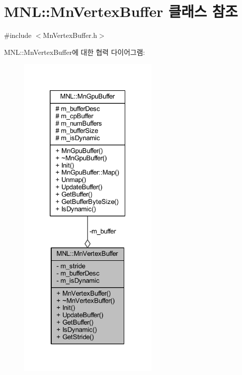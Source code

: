 \hypertarget{class_m_n_l_1_1_mn_vertex_buffer}{}\section{M\+NL\+:\+:Mn\+Vertex\+Buffer 클래스 참조}
\label{class_m_n_l_1_1_mn_vertex_buffer}


{\ttfamily \#include $<$Mn\+Vertex\+Buffer.\+h$>$}



M\+NL\+:\+:Mn\+Vertex\+Buffer에 대한 협력 다이어그램\+:\nopagebreak
\begin{figure}[H]
\begin{center}
\leavevmode
\includegraphics[width=193pt]{class_m_n_l_1_1_mn_vertex_buffer__coll__graph}
\end{center}
\end{figure}
